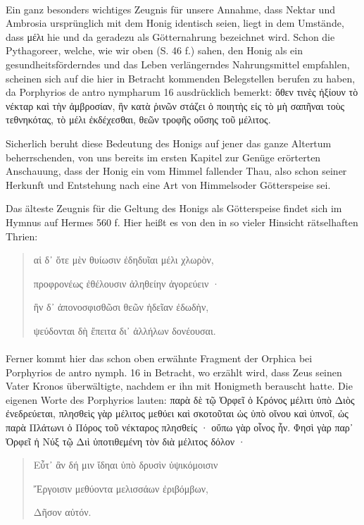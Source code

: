 \documentclass[a4paper, 11pt, oneside]{article}
\begin{document}
\paragraph{}
Ein ganz besonders wichtiges Zeugnis für unsere Annahme, dass Nektar und Ambrosia ursprünglich mit dem Honig identisch seien, liegt in dem Umstände, dass μέλι hie und da geradezu als Götternahrung bezeichnet wird. Schon die Pythagoreer, welche, wie wir oben (S. 46 f.) sahen, den Honig als ein gesundheitsförderndes und das Leben verlängerndes Nahrungsmittel empfahlen, scheinen sich auf die hier in Betracht kommenden Belegstellen berufen zu haben, da Porphyrios de antro nympharum 16 ausdrücklich bemerkt: ὅθεν τινὲς ἠξίουν τὸ νέκταρ καὶ τὴν ἀμβροσίαν, ἣν κατὰ ῥινῶν στάζει ὁ ποιητὴς εἰς τὸ μὴ σαπῆναι τοὺς τεθνηκότας, τὸ μέλι ἐκδέχεσθαι, θεῶν τροφῆς οὔσης τοῦ μέλιτος.

Sicherlich beruht diese Bedeutung des Honigs auf jener das ganze Altertum beherrschenden, von uns bereits im ersten Kapitel zur Genüge erörterten Anschauung, dass der Honig ein vom Himmel fallender Thau, also schon seiner Herkunft und Entstehung nach eine Art von Himmelsoder Götterspeise sei.

Das älteste Zeugnis für die Geltung des Honigs als Götterspeise findet sich im Hymnus auf Hermes 560 f. Hier heißt es von den in so vieler Hinsicht rätselhaften Thrien:
\begin{quotation}\large
αἱ δ᾽ ὅτε μὲν θυίωσιν ἐδηδυῖαι μέλι χλωρὸν,

προφρονέως ἐθέλουσιν ἀληθείην ἀγορεύειν ·

ἣν δ᾽ ἀπονοσφισθῶσι θεῶν ἡδεῖαν ἐδωδὴν,

ψεύδονται δὴ ἔπειτα δι᾽ ἀλλήλων δονέουσαι.
\end{quotation}
\paragraph{}
Ferner kommt hier das schon oben erwähnte Fragment der Orphica bei Porphyrios de antro nymph. 16 in Betracht, wo erzählt wird, dass Zeus seinen Vater Kronos überwältigte, nachdem er ihn mit Honigmeth berauscht hatte. Die eigenen Worte des Porphyrios lauten: παρὰ δὲ τῷ Ὀρφεῖ ὁ Κρόνος μέλιτι ὑπὸ Διὸς ἐνεδρεύεται, πλησθεὶς γὰρ μέλιτος μεθύει καὶ σκοτοῦται ὡς ὑπὸ οἴνου καὶ ὑπνοῖ, ὡς παρὰ Πλάτωνι ὁ Πόρος τοῦ νέκταρος πλησθείς · οὔπω γὰρ οἷνος ἦν. Φησὶ γὰρ παρ᾽ Ὀρφεῖ ἡ Νύξ τῷ Διὶ ὑποτιθεμένη τὸν διὰ μέλιτος δόλον ·
\begin{quotation}\large
Εὖτ᾽ ἂν δή μιν ἴδηαι ὑπὸ δρυσὶν ὑψικόμοισιν

Ἔργοισιν μεθύοντα μελισσάων ἐριβόμβων,

Δῆσον αὐτόν.
\end{quotation}
\end{document}
